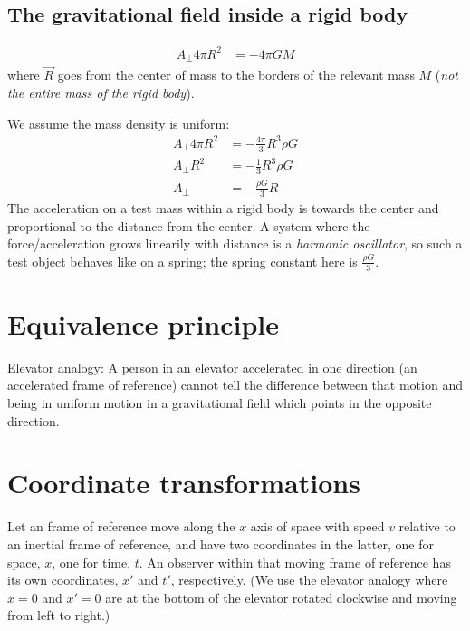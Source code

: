 \documentclass[pagesize,headsepline,10pt,parskip=half,BCOR=12mm]{scrreprt}
\begin{document}
      \subsection{The gravitational field inside a rigid body}
        \begin{align}
          A_\perp 4 \pi R^2 &= -4 \pi G M
        \end{align}
        where $\vec R$ goes from the center of mass to the
        borders of the relevant mass $M$ (\emph{not the entire mass
        of the rigid body}).

        We assume the mass density is uniform:
        \begin{align}
          A_\perp 4 \pi R^2 &= -\frac{4\pi}{3} R^3 \rho G \\
          A_\perp R^2 &= -\frac{1}{3} R^3 \rho G \\
          A_\perp &= -\frac{\rho G}{3} R
        \end{align}
        The acceleration on a test mass within a rigid body is
        towards the center and proportional to the distance
        from the center. A system where the force/acceleration
        grows linearily with distance is a \emph{harmonic
        oscillator}, so such a test object behaves like on a
        spring; the spring constant here is $\frac{\rho G}{3}$.

    \section{Equivalence principle}
      Elevator analogy: A person in an elevator accelerated in one
      direction (an accelerated frame of reference) cannot tell the
      difference between that motion and being in uniform motion in
      a gravitational field which points in the opposite direction.

    \section{Coordinate transformations}
      Let an frame of reference move along the $x$ axis of space
      with speed $v$ relative to an inertial frame of reference,
      and have two coordinates in the latter, one for space, $x$,
      one for time, $t$. An observer within that moving frame of
      reference has its own coordinates, $x'$ and $t'$,
      respectively. (We use the elevator analogy where $x=0$ and
      $x'=0$ are at the bottom of the elevator rotated clockwise
      and moving from left to right.)
\end{document}
